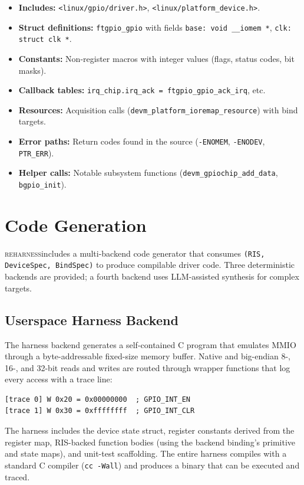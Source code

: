 \documentclass[sigconf,review]{acmart}
\newcommand{\reharness}{\textsc{reharness}}
\begin{document}
\begin{itemize}
\item \textbf{Includes:} \texttt{<linux/gpio/driver.h>}, \texttt{<linux/platform\_device.h>}.
\item \textbf{Struct definitions:} \texttt{ftgpio\_gpio} with fields \texttt{base: void \_\_iomem *}, \texttt{clk: struct clk *}.
\item \textbf{Constants:} Non-register macros with integer values (flags, status codes, bit masks).
\item \textbf{Callback tables:} \texttt{irq\_chip.irq\_ack = ftgpio\_gpio\_ack\_irq}, etc.
\item \textbf{Resources:} Acquisition calls (\texttt{devm\_platform\_ioremap\_resource}) with bind targets.
\item \textbf{Error paths:} Return codes found in the source (\texttt{-ENOMEM}, \texttt{-ENODEV}, \texttt{PTR\_ERR}).
\item \textbf{Helper calls:} Notable subsystem functions (\texttt{devm\_gpiochip\_add\_data}, \texttt{bgpio\_init}).
\end{itemize}

\section{Code Generation}

\reharness includes a multi-backend code generator that consumes \texttt{(RIS, DeviceSpec, BindSpec)} to produce compilable driver code. Three deterministic backends are provided; a fourth backend uses LLM-assisted synthesis for complex targets.

\subsection{Userspace Harness Backend}

The harness backend generates a self-contained C program that emulates MMIO through a byte-addressable fixed-size memory buffer. Native and big-endian 8-, 16-, and 32-bit reads and writes are routed through wrapper functions that log every access with a trace line:

\begin{lstlisting}
[trace 0] W 0x20 = 0x00000000  ; GPIO_INT_EN
[trace 1] W 0x30 = 0xffffffff  ; GPIO_INT_CLR
\end{lstlisting}

The harness includes the device state struct, register constants derived from the register map, RIS-backed function bodies (using the backend binding's primitive and state maps), and unit-test scaffolding. The entire harness compiles with a standard C compiler (\texttt{cc -Wall}) and produces a binary that can be executed and traced.
\end{document}
